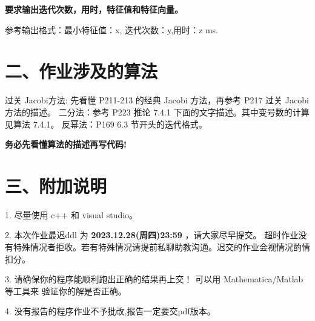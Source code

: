 \documentclass{article}
\begin{document}
\textbf{要求输出迭代次数，用时，特征值和特征向量。}

参考输出格式：最小特征值：x, 迭代次数：y,用时：z ms.

\section*{二、作业涉及的算法}

过关 Jacobi方法: 先看懂 P211-213 的经典 Jacobi 方法，再参考 P217 过关 Jacobi 方法的描述。
二分法：参考 P223 推论 7.4.1 下面的文字描述。其中变号数的计算见算法 7.4.1。
反幂法：P169 6.3 节开头的迭代格式。

\textbf{务必先看懂算法的描述再写代码!}


\section*{三、附加说明}
1. 尽量使用 c++ 和 visual studio。

2. 本次作业最迟ddl 为 \textbf{2023.12.28(周四)23:59} ，请大家尽早提交。
超时作业没有特殊情况者拒收。若有特殊情况请提前私聊助教沟通。迟交的作业会视情况酌情扣分。

3. 请确保你的程序能顺利跑出正确的结果再上交！
可以用 Mathematica/Matlab 等工具来 验证你的解是否正确。

4. 没有报告的程序作业不予批改,报告一定要交pdf版本。
\end{document}

